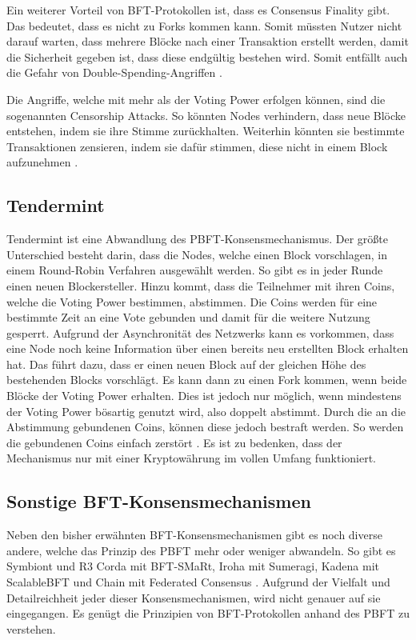 Ein weiterer Vorteil von \acs{BFT}-Protokollen ist, dass es Consensus Finality gibt. Das bedeutet, dass es nicht zu Forks kommen kann. Somit müssten Nutzer nicht darauf warten, dass mehrere Blöcke nach einer Transaktion erstellt werden, damit die Sicherheit gegeben ist, dass diese endgültig bestehen wird. Somit entfällt auch die Gefahr von Double-Spending-Angriffen \cite{Vukolicquestscalableblockchain2015}.

Die Angriffe, welche mit mehr als  der Voting Power erfolgen können, sind die sogenannten Censorship Attacks. So könnten Nodes verhindern, dass neue Blöcke entstehen, indem sie ihre Stimme zurückhalten. Weiterhin könnten sie bestimmte Transaktionen zensieren, indem sie dafür stimmen, diese nicht in einem Block aufzunehmen \cite{TendermintTeamTendermintGithubRepository2018}.

\subsection{Tendermint}
Tendermint ist eine Abwandlung des \acs{PBFT}-Konsensmechanismus. Der größte Unterschied besteht darin, dass die Nodes, welche einen Block vorschlagen, in einem Round-Robin Verfahren ausgewählt werden. So gibt es in jeder Runde einen neuen Blockersteller. Hinzu kommt, dass die Teilnehmer mit ihren Coins, welche die Voting Power bestimmen, abstimmen. Die Coins werden für eine bestimmte Zeit an eine Vote gebunden und damit für die weitere Nutzung gesperrt. Aufgrund der Asynchronität des Netzwerks kann es vorkommen, dass eine Node noch keine Information über einen bereits neu erstellten Block erhalten hat. Das führt dazu, dass er einen neuen Block auf der gleichen Höhe des bestehenden Blocks vorschlägt. Es kann dann zu einen Fork kommen, wenn beide Blöcke  der Voting Power erhalten. Dies ist jedoch nur möglich, wenn mindestens  der Voting Power bösartig genutzt wird, also doppelt abstimmt. Durch die an die Abstimmung gebundenen Coins, können diese jedoch bestraft werden. So werden die gebundenen Coins einfach zerstört \cite{KwonTendermintConsensusmining2014}\cite{BuchmanTendermintByzantineFault2016}. Es ist zu bedenken, dass der Mechanismus nur mit einer Kryptowährung im vollen Umfang funktioniert.

\subsection{Sonstige BFT-Konsensmechanismen}
Neben den bisher erwähnten \acs{BFT}-Konsensmechanismen gibt es noch diverse andere, welche das Prinzip des \acs{PBFT} mehr oder weniger abwandeln. So gibt es Symbiont und R3 Corda mit BFT-SMaRt, Iroha mit Sumeragi, Kadena mit ScalableBFT und Chain mit Federated Consensus \cite{CachinBlockchainConsensusProtocols2017}. Aufgrund der Vielfalt und Detailreichheit jeder dieser Konsensmechanismen, wird nicht genauer auf sie eingegangen. Es genügt die Prinzipien von \acs{BFT}-Protokollen anhand des \acs{PBFT} zu verstehen.

